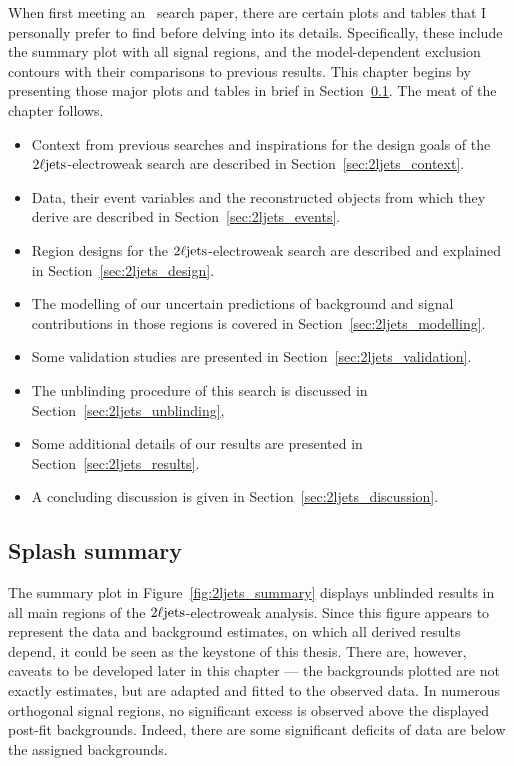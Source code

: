 When first meeting an \atlas\ search paper,
there are certain plots and tables that I personally prefer to find before
delving into its details.
Specifically, these include the summary plot with all signal regions,
and the model-dependent exclusion contours with their comparisons to previous
results.
This chapter begins by presenting those major plots and tables in brief in
Section~\ref{sec:2ljets_splash}.
The meat of the chapter follows.
\begin{itemize}
\item Context from previous searches and inspirations for the design goals
of the $2\ell\mathrm{jets}$-electroweak search are described in
Section~\ref{sec:2ljets_context}.
\item Data, their event variables and the reconstructed objects from which
they derive are described in Section~\ref{sec:2ljets_events}.
\item Region designs for the $2\ell\mathrm{jets}$-electroweak search are described and
explained in Section~\ref{sec:2ljets_design}.
\item The modelling of our uncertain predictions of background and signal
contributions in those regions is covered in
Section~\ref{sec:2ljets_modelling}.
\item Some validation studies are presented in
Section~\ref{sec:2ljets_validation}.
\item The unblinding procedure of this search is discussed in
Section~\ref{sec:2ljets_unblinding},
\item Some additional details of our results are presented in
Section~\ref{sec:2ljets_results}.
\item A concluding discussion is given in
Section~\ref{sec:2ljets_discussion}.
\end{itemize}


\subsection{Splash summary}
\label{sec:2ljets_splash}
The summary plot in Figure~\ref{fig:2ljets_summary} displays unblinded results
in all main regions of the $2\ell\mathrm{jets}$-electroweak analysis.
Since this figure appears to represent the data and background estimates,
on which all derived results depend, it could be seen as the keystone of this
thesis.
There are, however, caveats to be developed later in this chapter ---
the backgrounds plotted are not exactly estimates, but are adapted and fitted
to the observed data.
In numerous orthogonal signal regions, no significant excess is observed
above the displayed post-fit backgrounds.
Indeed, there are some significant deficits of data are below the assigned
backgrounds.

